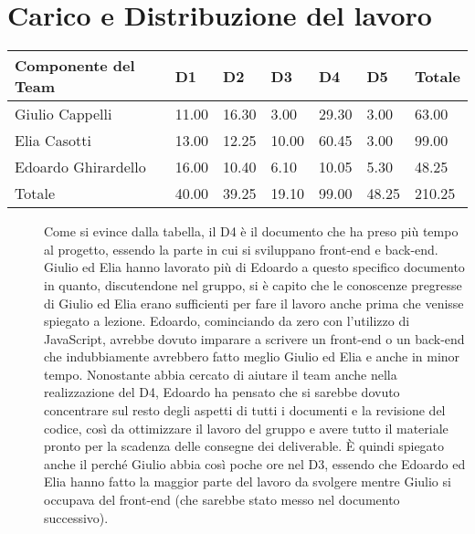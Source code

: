 \documentclass{article}
\begin{document}
\section{Carico e Distribuzione del lavoro}
\begin{center}
    \begin{longtable}{|l|l|l|l|l|l|l|}
        \hline
        Componente del Team & D1    & D2    & D3    & D4    & D5    & Totale \\ \hline
        Giulio Cappelli     & 11.00 & 16.30 & 3.00  & 29.30 & 3.00  & 63.00  \\ \hline
        Elia Casotti        & 13.00 & 12.25 & 10.00 & 60.45 & 3.00  & 99.00  \\ \hline
        Edoardo Ghirardello & 16.00 & 10.40 & 6.10  & 10.05 & 5.30  & 48.25  \\ \hline
        Totale              & 40.00 & 39.25 & 19.10 & 99.00 & 48.25 & 210.25 \\ \hline
    \end{longtable}
\end{center}
\begin{description}
    \item[] Come si evince dalla tabella, il D4 è il documento che ha preso più tempo al progetto, essendo la parte in cui si sviluppano front-end e back-end.
        Giulio ed Elia hanno lavorato più di Edoardo a questo specifico documento in quanto, discutendone nel gruppo, si è capito che le conoscenze pregresse di Giulio ed Elia erano sufficienti per fare il lavoro anche prima che venisse spiegato a lezione.
        Edoardo, cominciando da zero con l'utilizzo di JavaScript, avrebbe dovuto imparare a scrivere un front-end o un back-end che indubbiamente avrebbero fatto meglio Giulio ed Elia e anche in minor tempo.
        Nonostante abbia cercato di aiutare il team anche nella realizzazione del D4, Edoardo ha pensato che si sarebbe dovuto concentrare sul resto degli aspetti di tutti i documenti e la revisione del codice, così da ottimizzare il lavoro del gruppo e avere tutto il materiale pronto per la scadenza delle consegne dei deliverable.
        È quindi spiegato anche il perché Giulio abbia così poche ore nel D3, essendo che Edoardo ed Elia hanno fatto la maggior parte del lavoro da svolgere mentre Giulio si occupava del front-end (che sarebbe stato messo nel documento successivo).
\end{description}
\clearpage
\end{document}
